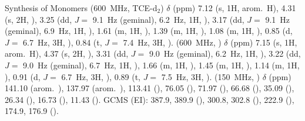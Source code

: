 \begin{section}{Synthesis of Monomers}
{\HNMR} (\SI{600}{\MHz}, \gls{TCE}-d$_2$) $\delta$ (ppm) 7.12 (s, 1H, arom.\ H), 4.31 (s, 2H, ), 3.25 (dd, $J =$ \SI{9.1}{\Hz} (geminal), \SI{6.2}{\Hz}, 1H, ), 3.17 (dd, $J =$ \SI{9.1}{\Hz} (geminal), \SI{6.9}{\Hz}, 1H, ), 1.61 (m, 1H, ), 1.39 (m, 1H, ), 1.08 (m, 1H, ), 0.85 (d, $J =$ \SI{6.7}{\Hz}, 3H, ), 0.84 (t, $J =$ \SI{7.4}{\Hz}, 3H, ).
{\HNMR} (\SI{600}{\MHz}, ) $\delta$ (ppm) 7.15 (s, 1H, arom.\ H), 4.37 (s, 2H, ), 3.31 (dd, $J =$ \SI{9.0}{\Hz} (geminal), \SI{6.2}{\Hz}, 1H, ), 3.22 (dd, $J =$ \SI{9.0}{\Hz} (geminal), \SI{6.7}{\Hz}, 1H, ), 1.66 (m, 1H, ), 1.45 (m, 1H, ), 1.14 (m, 1H, ), 0.91 (d, $J =$ \SI{6.7}{\Hz}, 3H, ), 0.89 (t, $J =$ \SI{7.5}{\Hz}, 3H, ). 
{\CNMR} (\SI{150}{\MHz}, ) $\delta$ (ppm) 141.10 (arom.\ ), 137.97 (arom.\ ), 113.41 (), 76.05 (), 71.97 (), 66.68 (), 35.09 (), 26.34 (), 16.73 (), 11.43 ().
\gls{GCMS} (EI): 387.9, 389.9 (), 300.8, 302.8 (), 222.9 (), 174.9, 176.9 ().

\end{section}
